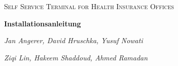 \documentclass[12, A4]{article}
\date{\today}
\begin{document}
\begin{titlepage} %
\centering

	{\scshape\LARGE Self Service Terminal for Health Insurance Offices\par}
	\vspace{5cm}

	{\huge\bfseries Installationsanleitung\par}
	\vspace{4.5cm}
	{\Large\itshape Jan Angerer, David Hruschka, Yusuf Nowati \par}
	\vspace{0.5cm}
	{\Large\itshape Ziqi Lin, Hakeem Shaddoud, Ahmed Ramadan \par}
	\vfill


	\vfill


\end{titlepage} %




\newpage
\tableofcontents  %
\newpage








\end{document}
